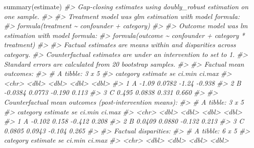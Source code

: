 \documentclass[
]{article}
\newenvironment{Shaded}{\begin{snugshade}}{\end{snugshade}}
\newcommand{\CommentTok}[1]{\textcolor[rgb]{0.56,0.35,0.01}{\textit{#1}}}
\newcommand{\FunctionTok}[1]{\textcolor[rgb]{0.00,0.00,0.00}{#1}}
\newcommand{\NormalTok}[1]{#1}
\begin{document}
\begin{Shaded}
\begin{Highlighting}[]
\FunctionTok{summary}\NormalTok{(estimate)}
\CommentTok{\#\textgreater{} Gap{-}closing estimates using doubly\_robust estimation on one sample.}
\CommentTok{\#\textgreater{} }
\CommentTok{\#\textgreater{} Treatment model was glm estimation with model formula:}
\CommentTok{\#\textgreater{} formula(treatment \textasciitilde{} confounder + category)}
\CommentTok{\#\textgreater{} }
\CommentTok{\#\textgreater{} Outcome model was lm estimation with model formula:}
\CommentTok{\#\textgreater{} formula(outcome \textasciitilde{} confounder + category * treatment)}
\CommentTok{\#\textgreater{} }
\CommentTok{\#\textgreater{} Factual estimates are means within and disparities across category.}
\CommentTok{\#\textgreater{} Counterfactual estimates are under an intervention to set  to 1.}
\CommentTok{\#\textgreater{} Standard errors are calculated from 20 bootstrap samples.}
\CommentTok{\#\textgreater{} }
\CommentTok{\#\textgreater{} Factual mean outcomes:}
\CommentTok{\#\textgreater{} \# A tibble: 3 x 5}
\CommentTok{\#\textgreater{}   category estimate     se ci.min ci.max}
\CommentTok{\#\textgreater{}   \textless{}chr\textgreater{}       \textless{}dbl\textgreater{}  \textless{}dbl\textgreater{}  \textless{}dbl\textgreater{}  \textless{}dbl\textgreater{}}
\CommentTok{\#\textgreater{} 1 A         {-}1.09   0.0782 {-}1.24  {-}0.938}
\CommentTok{\#\textgreater{} 2 B         {-}0.0384 0.0773 {-}0.190  0.113}
\CommentTok{\#\textgreater{} 3 C          0.495  0.0838  0.331  0.660}
\CommentTok{\#\textgreater{} }
\CommentTok{\#\textgreater{} Counterfactual mean outcomes (post{-}intervention means):}
\CommentTok{\#\textgreater{} \# A tibble: 3 x 5}
\CommentTok{\#\textgreater{}   category estimate     se ci.min ci.max}
\CommentTok{\#\textgreater{}   \textless{}chr\textgreater{}       \textless{}dbl\textgreater{}  \textless{}dbl\textgreater{}  \textless{}dbl\textgreater{}  \textless{}dbl\textgreater{}}
\CommentTok{\#\textgreater{} 1 A         {-}0.102  0.158  {-}0.412  0.208}
\CommentTok{\#\textgreater{} 2 B          0.0409 0.0880 {-}0.132  0.213}
\CommentTok{\#\textgreater{} 3 C          0.0805 0.0943 {-}0.104  0.265}
\CommentTok{\#\textgreater{} }
\CommentTok{\#\textgreater{} Factual disparities:}
\CommentTok{\#\textgreater{} \# A tibble: 6 x 5}
\CommentTok{\#\textgreater{}   category estimate     se ci.min ci.max}
\CommentTok{\#\textgreater{}   \textless{}chr\textgreater{}       \textless{}dbl\textgreater{}  \textless{}dbl\textgreater{}  \textless{}dbl\textgreater{}  \textless{}dbl\textgreater{}}

\end{Highlighting}
\end{Shaded}
\end{document}
